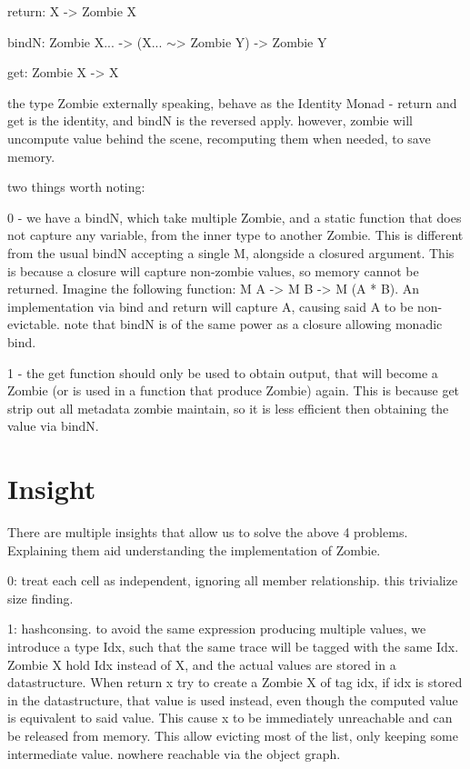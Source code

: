 \documentclass[acmsmall]{acmart}
\begin{document}
	return: X -> Zombie X

	bindN: Zombie X... -> (X... $\sim$> Zombie Y) -> Zombie Y

	get: Zombie X -> X
	
	the type Zombie externally speaking, behave as the Identity Monad - return and get is the identity, and bindN is the reversed apply. however, zombie will uncompute value behind the scene, recomputing them when needed, to save memory.
	
	two things worth noting:
	
	0 - we have a bindN, which take multiple Zombie, and a static function that does not capture any variable, from the inner type to another Zombie. This is different from the usual bindN accepting a single M, alongside a closured argument. This is because a closure will capture non-zombie values, so memory cannot be returned. Imagine the following function: M A -> M B -> M (A * B). An implementation via bind and return will capture A, causing said A to be non-evictable. note that bindN is of the same power as a closure allowing monadic bind.
	
	1 - the get function should only be used to obtain output, that will become a Zombie (or is used in a function that produce Zombie) again. This is because get strip out all metadata zombie maintain, so it is less efficient then obtaining the value via bindN.

	\section{Insight}
	There are multiple insights that allow us to solve the above 4 problems. Explaining them aid understanding the implementation of Zombie.
	
	0: treat each cell as independent, ignoring all member relationship.
	this trivialize size finding.
	
	1: hashconsing. to avoid the same expression producing multiple values, we introduce a type Idx, such that the same trace will be tagged with the same Idx.
	Zombie X hold Idx instead of X, and the actual values are stored in a datastructure.
	When return x try to create a Zombie X of tag idx, if idx is stored in the datastructure, that value is used instead, even though the computed value is equivalent to said value. This cause x to be immediately unreachable and can be released from memory. This allow evicting most of the list, only keeping some intermediate value. nowhere reachable via the object graph.
	
\end{document}
